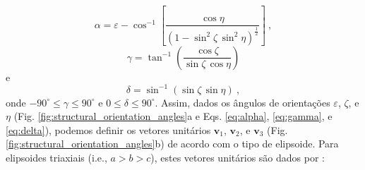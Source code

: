 \begin{equation}
\alpha = \varepsilon - \cos^{-1} \left[ \frac{\cos \eta}
{\left( 1 - \sin^{2} \zeta \, \sin^{2} \eta \right)^{\frac{1}{2}}}\right] \: ,
\label{eq:alpha}
\end{equation}
\begin{equation}
\gamma = \tan^{-1} \left( \frac{\cos \zeta}{\sin \zeta \, \cos \eta}\right)
\label{eq:gamma}
\end{equation}
e
\begin{equation}
\delta = \sin^{-1} \left( \sin \zeta \, \sin \eta \right) \: ,
\label{eq:delta}
\end{equation}
onde $-90^{\circ} \leq \gamma \leq 90^{\circ}$ e $0 \leq \delta \leq 90^{\circ}$. Assim, dados os ângulos de orientações $\varepsilon$, $\zeta$, e $\eta$ (Fig. \ref{fig:structural_orientation_angles}a e Eqs. \ref{eq:alpha}, \ref{eq:gamma}, e
\ref{eq:delta}), podemos definir os vetores unitários
$\mathbf{v}_{1}$, $\mathbf{v}_{2}$, e $\mathbf{v}_{3}$
(Fig. \ref{fig:structural_orientation_angles}b) de acordo com o tipo de elipsoide.
Para elipsoides triaxiais (i.e., $a > b > c$), estes vetores unitários são dados por \citep{clark1986}:

